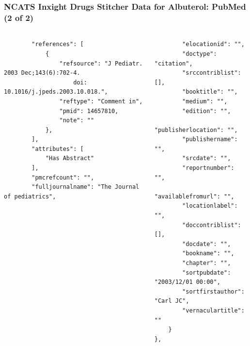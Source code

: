 \documentclass[aspectratio=169,xcolor=dvipsnames]{beamer}
\begin{document}
\begin{frame}[fragile,t]
  \frametitle{NCATS Inxight Drugs Stitcher Data for Albuterol: PubMed (2 of 2)}
  \framesubtitle{}
  \tiny
  \begin{columns}[t]
    \begin{column}{0.6\textwidth}
\begin{verbatim}
        "references": [
            {
                "refsource": "J Pediatr. 2003 Dec;143(6):702-4.
                    doi: 10.1016/j.jpeds.2003.10.018.",
                "reftype": "Comment in",
                "pmid": 14657810,
                "note": ""
            },
        ],
        "attributes": [
            "Has Abstract"
        ],
        "pmcrefcount": "",
        "fulljournalname": "The Journal of pediatrics",
\end{verbatim}
    \end{column}
    \begin{column}{0.4\textwidth}
\begin{verbatim}
        "elocationid": "",
        "doctype": "citation",
        "srccontriblist": [],
        "booktitle": "",
        "medium": "",
        "edition": "",
        "publisherlocation": "",
        "publishername": "",
        "srcdate": "",
        "reportnumber": "",
        "availablefromurl": "",
        "locationlabel": "",
        "doccontriblist": [],
        "docdate": "",
        "bookname": "",
        "chapter": "",
        "sortpubdate": "2003/12/01 00:00",
        "sortfirstauthor": "Carl JC",
        "vernaculartitle": ""
    }
},
\end{verbatim}
    \end{column}
  \end{columns}
\end{frame}
\end{document}
